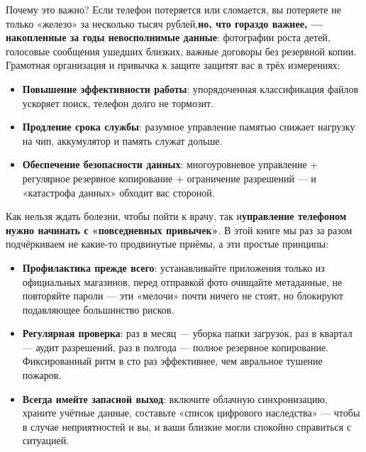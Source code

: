 \begin{tcbinfo}{Почему это важно?}
Если телефон потеряется или сломается, вы потеряете не только «железо» за несколько тысяч рублей,\textbf{но, что гораздо важнее, — накопленные за годы невосполнимые данные}: фотографии роста детей, голосовые сообщения ушедших близких, важные договоры без резервной копии. Грамотная организация и привычка к защите защитят вас в трёх измерениях:

\begin{itemize}
  \item \textbf{Повышение эффективности работы}: упорядоченная классификация файлов ускоряет поиск, телефон долго не тормозит.
  \item \textbf{Продление срока службы}: разумное управление памятью снижает нагрузку на чип, аккумулятор и память служат дольше.
  \item \textbf{Обеспечение безопасности данных}: многоуровневое управление + регулярное резервное копирование + ограничение разрешений — и «катастрофа данных» обходит вас стороной.
\end{itemize}

\end{tcbinfo}


Как нельзя ждать болезни, чтобы пойти к врачу, так и\textbf{управление телефоном нужно начинать с «повседневных привычек»}. В этой книге мы раз за разом подчёркиваем не какие-то продвинутые приёмы, а эти простые принципы:

\begin{itemize}
  \item \textbf{Профилактика прежде всего}: устанавливайте приложения только из официальных магазинов, перед отправкой фото очищайте метаданные, не повторяйте пароли — эти «мелочи» почти ничего не стоят, но блокируют подавляющее большинство рисков.
  \item \textbf{Регулярная проверка}: раз в месяц — уборка папки загрузок, раз в квартал — аудит разрешений, раз в полгода — полное резервное копирование. Фиксированный ритм в сто раз эффективнее, чем авральное тушение пожаров.
  \item \textbf{Всегда имейте запасной выход}: включите облачную синхронизацию, храните учётные данные, составьте «список цифрового наследства» — чтобы в случае неприятностей и вы, и ваши близкие могли спокойно справиться с ситуацией.
\end{itemize}
